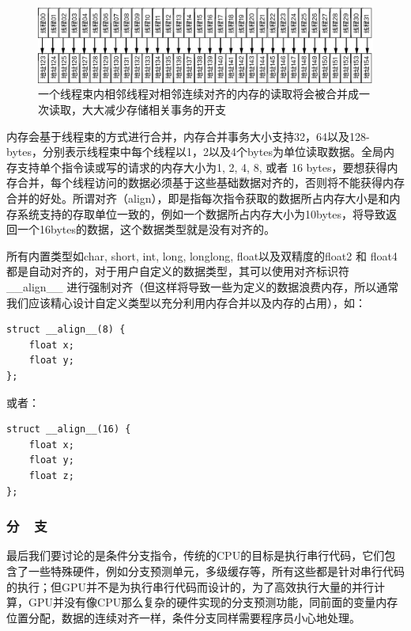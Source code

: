 \begin{figure}
	\begin{fullwidth}
		\includegraphics[width=1.0\thewidth]{figures/rp/coalescing}
		\caption{一个线程束内相邻线程对相邻连续对齐的内存的读取将会被合并成一次读取，大大减少存储相关事务的开支}
		\label{f:rp-coalescing}
	\end{fullwidth}
\end{figure}

内存会基于线程束的方式进行合并，内存合并事务大小支持32，64以及128-bytes，分别表示线程束中每个线程以1，2以及4个bytes为单位读取数据。全局内存支持单个指令读或写的请求的内存大小为1, 2, 4, 8, 或者 16 bytes，要想获得内存合并，每个线程访问的数据必须基于这些基础数据对齐的，否则将不能获得内存合并的好处。所谓对齐（align），即是指每次指令获取的数据所占内存大小是和内存系统支持的存取单位一致的，例如一个数据所占内存大小为10bytes，将导致返回一个16bytes的数据，这个数据类型就是没有对齐的。

所有内置类型如char, short, int, long, longlong, float以及双精度的float2 和 float4都是自动对齐的，对于用户自定义的数据类型，其可以使用对齐标识符\_\_align\_\_ 进行强制对齐（但这样将导致一些为定义的数据浪费内存，所以通常我们应该精心设计自定义类型以充分利用内存合并以及内存的占用），如：

\begin{lstlisting}
struct __align__(8) {
    float x;
    float y; 
};
\end{lstlisting}

或者：
\begin{lstlisting}
struct __align__(16) {
	float x;
	float y;
	float z; 
};
\end{lstlisting}






\subsubsection{分~~支}
最后我们要讨论的是条件分支指令，传统的CPU的目标是执行串行代码，它们包含了一些特殊硬件，例如分支预测单元，多级缓存等，所有这些都是针对串行代码的执行；但GPU并不是为执行串行代码而设计的，为了高效执行大量的并行计算，GPU并没有像CPU那么复杂的硬件实现的分支预测功能，同前面的变量内存位置分配，数据的连续对齐一样，条件分支同样需要程序员小心地处理。

